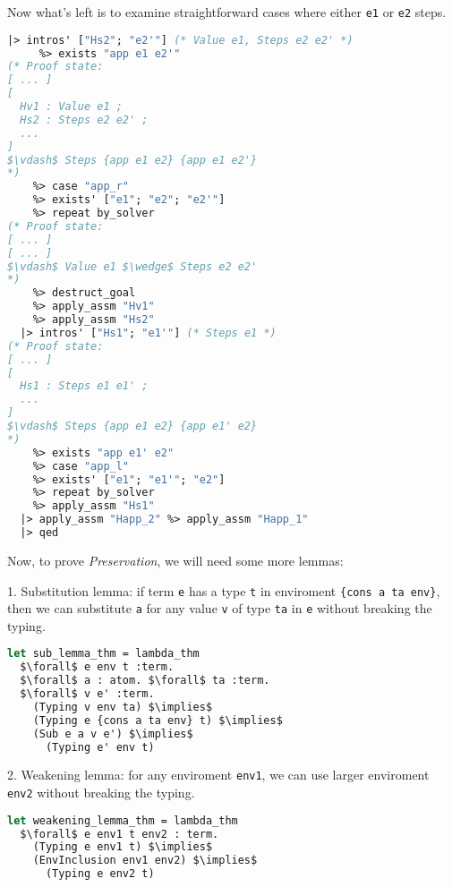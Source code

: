 \documentclass[english, mgr]{iithesis}
\renewcommand{\tt}[1]{\texttt{\small{#1}}}
\renewcommand{\it}[1]{\textit{#1}}
\begin{document}
Now what's left is to examine straightforward cases where either \tt{e1} or \tt{e2} steps.
\begin{lstlisting}[mathescape, language=OCaml]
  |> intros' ["Hs2"; "e2'"] (* Value e1, Steps e2 e2' *)
     %> exists "app e1 e2'"
(* Proof state:
[ ... ]
[
  Hv1 : Value e1 ;
  Hs2 : Steps e2 e2' ;
  ...
]
$\vdash$ Steps {app e1 e2} {app e1 e2'}
*)
    %> case "app_r"
    %> exists' ["e1"; "e2"; "e2'"]
    %> repeat by_solver
(* Proof state:
[ ... ]
[ ... ]
$\vdash$ Value e1 $\wedge$ Steps e2 e2'
*)
    %> destruct_goal
    %> apply_assm "Hv1"
    %> apply_assm "Hs2"
  |> intros' ["Hs1"; "e1'"] (* Steps e1 *)
(* Proof state:
[ ... ]
[
  Hs1 : Steps e1 e1' ;
  ...
]
$\vdash$ Steps {app e1 e2} {app e1' e2}
*)
    %> exists "app e1' e2"
    %> case "app_l"
    %> exists' ["e1"; "e1'"; "e2"]
    %> repeat by_solver
    %> apply_assm "Hs1"
  |> apply_assm "Happ_2" %> apply_assm "Happ_1"
  |> qed
\end{lstlisting}
Now, to prove \it{Preservation}, we will need some more lemmas:

1. Substitution lemma:
if term \tt{e} has a type \tt{t} in enviroment \tt{\{cons a ta env\}},
then we can substitute \tt{a} for any value \tt{v} of type \tt{ta} in \tt{e} without breaking the typing.
\begin{lstlisting}[mathescape,language=OCaml]
let sub_lemma_thm = lambda_thm
  $\forall$ e env t :term.
  $\forall$ a : atom. $\forall$ ta :term.
  $\forall$ v e' :term.
    (Typing v env ta) $\implies$
    (Typing e {cons a ta env} t) $\implies$
    (Sub e a v e') $\implies$
      (Typing e' env t)
\end{lstlisting}

2. Weakening lemma: for any enviroment \tt{env1}, we can use larger enviroment \tt{env2} without breaking the typing.
\begin{lstlisting}[mathescape,language=OCaml]
let weakening_lemma_thm = lambda_thm
  $\forall$ e env1 t env2 : term.
    (Typing e env1 t) $\implies$
    (EnvInclusion env1 env2) $\implies$
      (Typing e env2 t)
\end{lstlisting}
\end{document}
